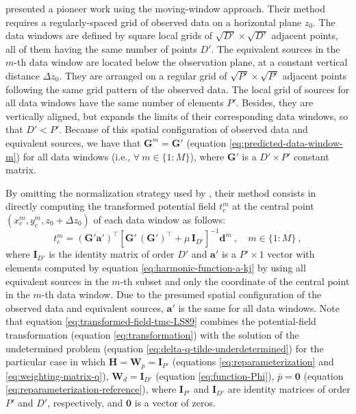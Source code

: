 \cite{leao-silva1989} presented a pioneer work using the moving-window approach.
Their method requires a regularly-spaced grid of observed data on a horizontal plane $z_{0}$. 
The data windows are defined by square local grids of $\sqrt{D'} \times \sqrt{D'}$ adjacent points, all of them having the
same number of points $D'$.
The equivalent sources in the $m$-th data window are located below the observation plane, at a constant vertical distance
$\Delta z_{0}$. They are arranged on a regular grid of $\sqrt{P'} \times \sqrt{P'}$ adjacent points 
following the same grid pattern of the observed data. 
The local grid of sources for all data windows have the same number of elements $P'$.
Besides, they are vertically aligned, but expands the limits of their corresponding data windows,
so that $D' < P'$.
Because of this spatial configuration of observed data and equivalent sources, we have that
$\mathbf{G}^{m} = \mathbf{G}'$ (equation \ref{eq:predicted-data-window-m}) for all data windows 
(i.e., $\forall \: m \in \{1 : M\}$), where $\mathbf{G}'$ is a $D' \times P'$ constant matrix.

By omitting the normalization strategy used by \cite{leao-silva1989}, their method consists in 
directly computing the transformed potential field $t^{m}_{c}$ at the central point $(x^{m}_{c}, y^{m}_{c}, z_{0} + \Delta z_{0})$ 
of each data window as follows:
\begin{equation}
	t^{m}_{c} = \left( \mathbf{G}' \mathbf{a}' \right)^{\top} 
	\left[ \mathbf{G}' \, \left( \mathbf{G}' \right)^{\top} + \mu \, \mathbf{I}_{D'} \right]^{-1} 
	\mathbf{d}^{m} \: , \quad m \in \{ 1 : M \} \: ,
	\label{eq:transformed-field-tmc-LS89}
\end{equation}
where $\mathbf{I}_{D'}$ is the identity matrix of order $D'$ and
$\mathbf{a}'$ is a $P' \times 1$ vector with elements computed by equation 
\ref{eq:harmonic-function-a-kj} by using all equivalent sources in the $m$-th subset and
only the coordinate of the central point in the $m$-th data window.
Due to the presumed spatial configuration of the observed 
data and equivalent sources, $\mathbf{a}'$ is the same for all data windows.
Note that equation \ref{eq:transformed-field-tmc-LS89} combines the potential-field transformation
(equation \ref{eq:transformation}) with the solution of the undetermined problem
(equation \ref{eq:delta-q-tilde-underdetermined}) for the particular case in which 
$\mathbf{H} = \mathbf{W}_{p} = \mathbf{I}_{P'}$ (equations \ref{eq:reparameterization} and \ref{eq:weighting-matrix-q}),
$\mathbf{W}_{d} = \mathbf{I}_{D'}$ (equation \ref{eq:function-Phi}), $\bar{p} = \mathbf{0}$ 
(equation \ref{eq:reparameterization-reference}), 
where $\mathbf{I}_{P'}$ and $\mathbf{I}_{D'}$ are identity matrices 
of order $P'$ and $D'$, respectively, and $\mathbf{0}$ is a vector of zeros. 

